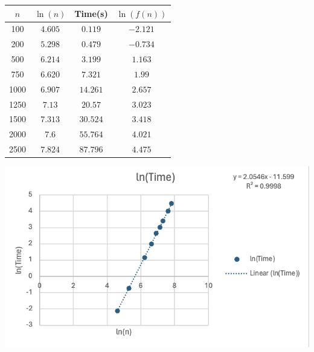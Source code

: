 \documentclass{article}
\begin{document}
\begin{minipage}{0.4\textwidth} %
    \centering

    
    
    \begin{tabular}{c|c|c|c}
        $n$ & $\ln(n)$ & Time(s) & $\ln(f(n))$ \\ \hline
        100 & $4.605$ & $0.119$ & $-2.121$ \\\hline
        200 & $5.298$ & $0.479$ & $-0.734$  \\\hline
        500 & $6.214$ & $3.199$ & $1.163$\\\hline
        750 & $6.620$ & $7.321$ & $1.99$\\\hline
        1000 & $6.907$ & $14.261$ & $2.657$\\ \hline
        1250 & $7.13$ & $20.57$ & $3.023$\\ \hline
        1500 & $7.313$ & $30.524$ & $3.418$\\ \hline
        2000 & $7.6$ & $55.764$ & $4.021$\\ \hline
        2500 & $7.824$ & $87.796$ & $4.475$\\
    \end{tabular}
    
\end{minipage}%
\begin{minipage}{0.6\textwidth} %

    

    \centering
    \includegraphics[width=1\linewidth]{Graphs/Naive.png} %

\end{minipage} \\
\end{document}
